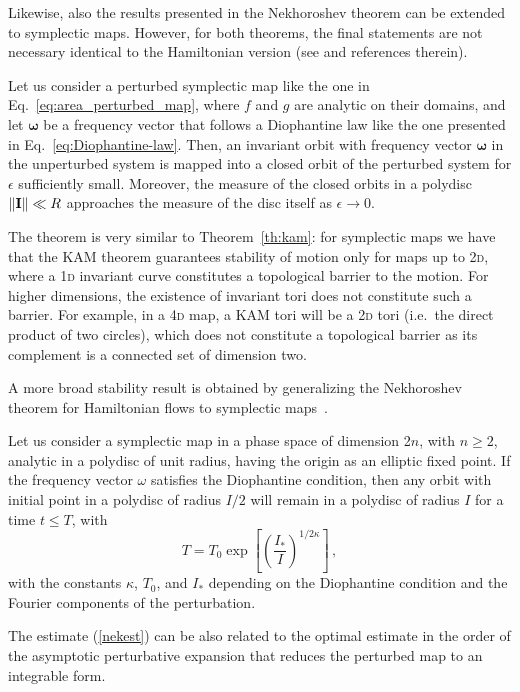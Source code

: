 Likewise, also the results presented in the Nekhoroshev theorem can be extended to symplectic maps. However, for both theorems, the final statements are not necessary identical to the Hamiltonian version (see \cite{Bazzani:262179} and references therein).

\begin{theorem}
    Let us consider a perturbed symplectic map like the one in Eq.~\eqref{eq:area_perturbed_map}, where $f$ and $g$ are analytic on their domains, and let $\boldsymbol{\omega}$ be a frequency vector that follows a Diophantine law like the one presented in Eq.~\eqref{eq:Diophantine-law}. Then, an invariant orbit with frequency vector $\boldsymbol{\omega}$ in the unperturbed system is mapped into a closed orbit of the perturbed system for $\epsilon$ sufficiently small. Moreover, the measure of the closed orbits in a polydisc $\norm{\vb{I}} \ll R$ approaches the measure of the disc itself as $\epsilon \to 0$. 
\end{theorem}

The theorem is very similar to Theorem~\ref{th:kam}: for symplectic maps we have that the KAM theorem guarantees stability of motion only for maps up to 2\textsc{d}, where a 1\textsc{d} invariant curve constitutes a topological barrier to the motion. For higher dimensions, the existence of invariant tori does not constitute such a barrier. For example, in a 4\textsc{d} map, a KAM tori will be a 2\textsc{d} tori (i.e.\ the direct product of two circles), which does not constitute a topological barrier as its complement is a connected set of dimension two.

A more broad stability result is obtained by generalizing the Nekhoroshev theorem for Hamiltonian flows to symplectic maps~\cite{Bazzani:1990aa, Turchetti:1990aa}.

\begin{theorem}
    Let us consider a symplectic map in a phase space of dimension 2$n$, with $n\geq 2$, analytic in a polydisc of unit radius, having the origin as an elliptic fixed point. If the frequency vector $\omega$ satisfies the Diophantine condition, then any orbit with initial point in a polydisc of radius $I/2$ will remain in a polydisc of radius $I$ for a time $t\leq T$, with
    \begin{equation}
    \label{nekest}
        T = T_0 \exp\left[\left(\frac{I_\ast}{I}\right)^{1/2\kappa}\right]\,,
    \end{equation}
    with the constants $\kappa$, $T_0$, and $I_\ast$ depending on the Diophantine condition and the Fourier components of the perturbation.
\end{theorem}
The estimate (\ref{nekest}) can be also related to the optimal estimate in the order of the asymptotic perturbative expansion that reduces the perturbed map to an integrable form.
